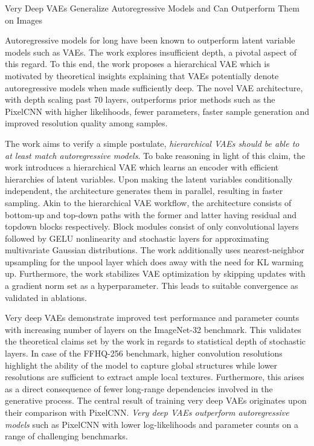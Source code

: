 \documentclass[11pt,letterpaper]{article}
\begin{document}
\begin{center}
  \large{Very Deep VAEs Generalize Autoregressive Models and Can Outperform Them on Images}
\end{center}

Autoregressive models for long have been known to outperform latent variable models such as VAEs. The work explores insufficient depth, a pivotal aspect of this regard. To this end, the work proposes a hierarchical VAE which is motivated by theoretical insights explaining that VAEs potentially denote autoregressive models when made sufficiently deep. The novel VAE architecture, with depth scaling past 70 layers, outperforms prior methods such as the PixelCNN with higher likelihoods, fewer parameters, faster sample generation and improved resolution quality among samples. 

The work aims to verify a simple postulate, \textit{hierarchical VAEs should be able to at least match autoregressive models}. To bake reasoning in light of this claim, the work introduces a hierarchical VAE which learns an encoder with efficient hierarchies of latent variables. Upon making the latent variables conditionally independent, the architecture generates them in parallel, resulting in faster sampling. Akin to the hierarchical VAE workflow, the architecture consists of bottom-up and top-down paths with the former and latter having residual and topdown blocks respectively. Block modules consist of only convolutional layers followed by GELU nonlinearity and stochastic layers for approximating multivariate Gaussian distributions. The work additionally uses nearest-neighbor upsampling for the unpool layer which does away with the need for KL warming up. Furthermore, the work stabilizes VAE optimization by skipping updates with a gradient norm set as a hyperparameter. This leads to suitable convergence as validated in ablations. 

Very deep VAEs demonstrate improved test performance and parameter counts with increasing number of layers on the ImageNet-32 benchmark. This validates the theoretical claims set by the work in regards to statistical depth of stochastic layers. In case of the FFHQ-256 benchmark, higher convolution resolutions highlight the ability of the model to capture global structures while lower resolutions are sufficient to extract ample local textures. Furthermore, this arises as a direct consequence of fewer long-range dependencies involved in the generative process. The central result of training very deep VAEs originates upon their comparison with PixelCNN. \textit{Very deep VAEs outperform autoregressive models} such as PixelCNN with lower log-likelihoods and parameter counts on a range of challenging benchmarks. 
\end{document}
